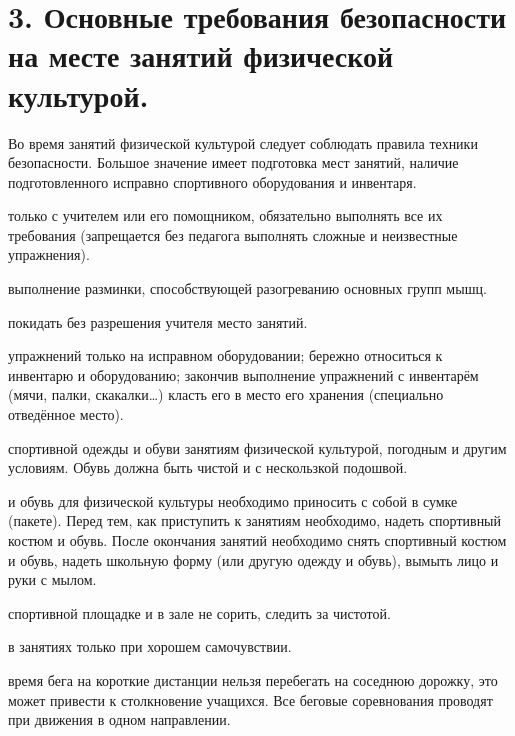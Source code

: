 \documentclass[bachelor, och, referat ]{SCWorks}
\begin{document}
\section{3. Основные требования безопасности на месте занятий физической культурой.}
Во время занятий физической культурой следует соблюдать правила техники безопасности. Большое значение имеет подготовка мест занятий, наличие подготовленного исправно спортивного оборудования и инвентаря. 
\begin{itemize}
\begin{itemize}
 только с учителем или его помощником, обязательно выполнять все их требования (запрещается без педагога выполнять сложные и неизвестные упражнения).

 выполнение разминки, способствующей разогреванию основных групп мышц.

 покидать без разрешения учителя место занятий.

 упражнений только на исправном оборудовании; бережно относиться к инвентарю и оборудованию; закончив выполнение упражнений с инвентарём (мячи, палки, скакалки…) класть его в место его хранения (специально отведённое место).

 спортивной одежды и обуви занятиям физической культурой, погодным и другим условиям. Обувь должна быть чистой и с нескользкой подошвой.

 и обувь для физической культуры необходимо приносить с собой в сумке (пакете). Перед тем, как приступить к занятиям необходимо, надеть спортивный костюм и обувь. После окончания занятий необходимо снять спортивный костюм и обувь, надеть школьную форму (или другую одежду и обувь), вымыть лицо и руки с мылом.

 спортивной площадке и в зале не сорить, следить за чистотой.

 в занятиях только при хорошем самочувствии.

 время бега на короткие дистанции нельзя перебегать на соседнюю дорожку, это может привести к столкновение учащихся. Все беговые соревнования проводят при движения в одном направлении.
\end{itemize}
\end{itemize}

\newpage
\end{document}
